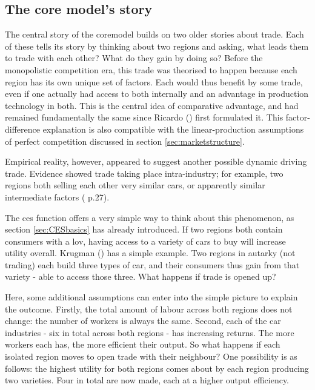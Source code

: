 \subsection{The core model's story \label{sec:cmstory}}

The central story of the \gls{coremodel} builds on two older stories about trade. Each of these tells its story by thinking about two regions and asking, what leads them to trade with each other? What do they gain by doing so? Before the monopolistic competition era, this trade was theorised to happen because each region has its own unique set of factors. Each would thus benefit by some trade, even if one actually had access to both internally and an advantage in production technology in both. This is the central idea of comparative advantage, and had remained fundamentally the same since Ricardo (\citeyear{ricardo_principles_1817}) first formulated it. This factor-difference explanation is also compatible with the linear-production assumptions of perfect competition discussed in section \ref{sec:marketstructure}.

Empirical reality, however, appeared to suggest another possible dynamic driving trade. Evidence showed trade taking place intra-industry; for example, two regions both selling each other very similar cars, or apparently similar intermediate factors (\citealt{brakman_monopolistic_2001} p.27). 

The \gls{ces} function offers a very simple way to think about this phenomenon, as section \ref{sec:CESbasics} has already introduced. If two regions both contain consumers with a \gls{lov}, having access to a variety of cars to buy will increase utility overall. Krugman (\citeyear{krugman_increasing_1979}) has a simple example. Two regions in autarky (not trading) each build three types of car, and their consumers thus gain from that variety - able to access those three. What happens if trade is opened up? 

Here, some additional assumptions can enter into the simple picture to explain the outcome. Firstly, the total amount of labour across both regions does not change: the number of workers is always the same. Second, each of the car industries - six in total across both regions - has increasing returns. The more workers each has, the more efficient their output. So what happens if each isolated region moves to open trade with their neighbour? One possibility is as follows: the highest utility for both regions comes about by each region producing two varieties. Four in total are now made, each at a higher output efficiency.

